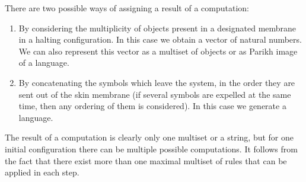 
There are two possible ways of assigning a result of a computation:

\begin{enumerate}
    \item By considering the multiplicity of objects present in a designated membrane in a halting configuration. In this case we obtain a vector of natural numbers. We can also represent this vector as a multiset of objects or as Parikh image of a language.
    \item By concatenating the symbols which leave the system, in the order they are sent out of the skin membrane (if several symbols are expelled at the same time, then any ordering of them is considered). In this case we generate a language.
\end{enumerate}

The result of a computation is clearly only one multiset or a string, but for one initial configuration there can be multiple possible computations. It follows from the fact that there exist more than one maximal multiset of rules that can be applied in each step.